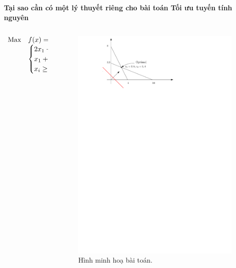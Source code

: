 \documentclass[10pt]{beamer}
\begin{document}
\begin{frame}{\bf Tại sao cần có một lý thuyết riêng cho bài toán Tối ưu tuyến tính nguyên}

\begin{columns}
    \begin{column}{0.5\textwidth}
        \begin{equation*}
        \begin{array}{lll}            
        {\rm Max}&f(x)=2x_1+2x_2\\
        & \begin{cases}
        2x_1+x_2 \leq  8 \\
        x_1+3x_2 \leq 10 \\
        x_i\geq 0,\forall i=1,2.
        \end{cases} 
        \end{array}
        \end{equation*}
    \end{column}

    \begin{column}{0.5\textwidth}
        \begin{figure}
        \centering
        \includegraphics[width=1\linewidth]{Nhom1_hinh.pdf}
        \caption{Hình minh hoạ bài toán.}
        \end{figure}
    \end{column}
\end{columns}
\end{frame}
\end{document}
